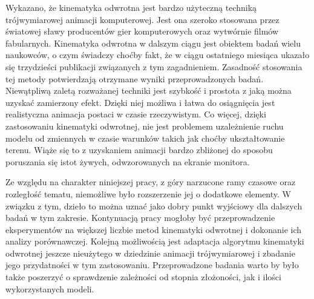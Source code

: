 \documentclass[11pt]{mwrep}
\begin{document}
Wykazano, że kinematyka odwrotna jest bardzo użyteczną techniką trójwymiarowej animacji komputerowej. Jest ona szeroko stosowana przez światowej sławy producentów gier komputerowych oraz wytwórnie filmów fabularnych. Kinematyka odwrotna w dalszym ciągu jest obiektem badań wielu naukowców, o czym świadczy choćby fakt, że w ciągu ostatniego miesiąca ukazało się trzydzieści publikacji związanych z tym zagadnieniem. Zasadność stosowania tej metody potwierdzają otrzymane wyniki przeprowadzonych badań. Niewątpliwą zaletą rozważanej techniki jest szybkość i prostota z jaką można uzyskać zamierzony efekt. Dzięki niej możliwa i łatwa do osiągnięcia jest realistyczna animacja postaci w czasie rzeczywistym. Co więcej, dzięki zastosowaniu kinematyki odwrotnej, nie jest problemem uzależnienie ruchu modelu od zmiennych w czasie warunków takich jak choćby ukształtowanie terenu. Wiąże się to z uzyskaniem animacji bardzo zbliżonej do sposobu poruszania się istot żywych, odwzorowanych na ekranie monitora.


Ze względu na charakter niniejszej pracy, z góry narzucone ramy czasowe oraz rozległość tematu, niemożliwe było rozszerzenie jej o dodatkowe elementy. W związku z tym, dzieło to można uznać jako dobry punkt wyjściowy dla dalszych badań w tym zakresie. Kontynuacją pracy mogłoby być przeprowadzenie eksperymentów na większej liczbie metod kinematyki odwrotnej i dokonanie ich analizy porównawczej. Kolejną możliwością jest adaptacja algorytmu kinematyki odwrotnej jeszcze nieużytego w dziedzinie animacji trójwymiarowej i zbadanie jego przydatności w tym zastosowaniu. Przeprowadzone badania warto by było także poszerzyć o sprawdzenie zależności od stopnia złożoności, jak i ilości wykorzystanych modeli.


\renewcommand{\lstlistlistingname}{Spis listingów}

\listoftables
\listoffigures
\lstlistoflistings


\end{document}
